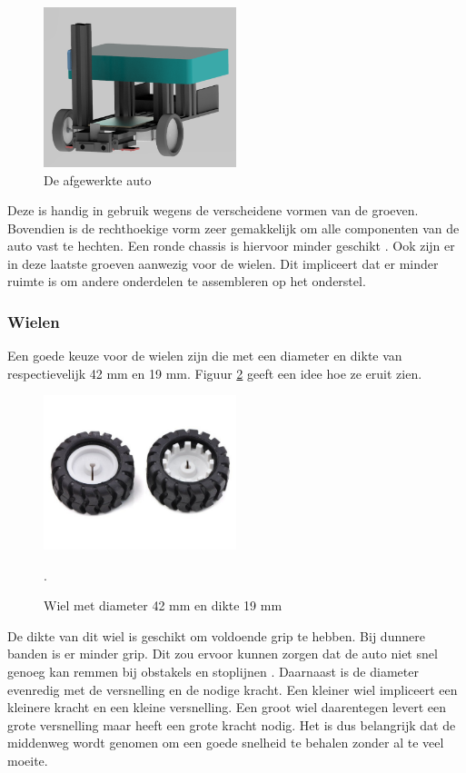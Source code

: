 \documentclass[a4paper,twoside,kulak]{kulakreport} %
\begin{document}
\begin{figure}
	\includegraphics[width=0.5\textwidth]{4Volledig}
	\centering
	\caption{De afgewerkte auto}
	\label{opbouw4}
\end{figure}

Deze is handig in gebruik wegens de verscheidene vormen van de groeven. %
Bovendien is de rechthoekige vorm zeer gemakkelijk om alle componenten van de auto vast te hechten. Een ronde chassis is hiervoor minder geschikt \cite{RobotChassis}. Ook zijn er in deze laatste groeven aanwezig voor de wielen. Dit impliceert dat er minder ruimte is om andere onderdelen te assembleren op het onderstel. %
\label{Chassis}

\subsubsection{Wielen}
Een goede keuze voor de wielen zijn die met een diameter en dikte van respectievelijk 42 mm en 19 mm.
Figuur \ref{fig:wiel} geeft een idee hoe ze eruit zien.

\begin{figure}
	\includegraphics[width=0.5\textwidth]{wielen}
	\centering
	\caption{Wiel met diameter 42 mm en dikte 19 mm} 
	\cite{Wiel42x19mm}.
	\label{fig:wiel}
\end{figure}

De dikte van dit wiel is geschikt om voldoende grip te hebben. Bij dunnere banden is er minder grip. Dit zou ervoor kunnen zorgen dat de auto niet snel genoeg kan remmen bij obstakels en stoplijnen \cite{Banden}.  
Daarnaast is de diameter evenredig met de versnelling en de nodige kracht. Een kleiner wiel impliceert een kleinere kracht en een kleine versnelling. Een groot wiel daarentegen levert een grote versnelling maar heeft een grote kracht nodig. Het is dus belangrijk dat de middenweg wordt genomen om een goede snelheid te behalen zonder al te veel moeite.    
\end{document}
